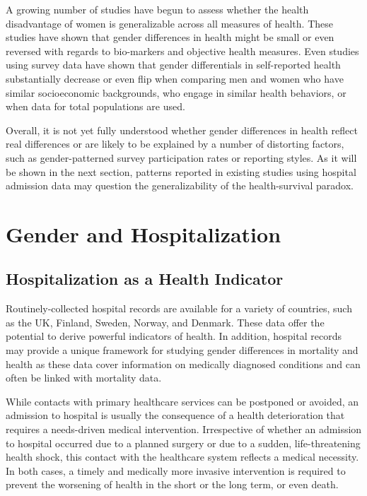 A growing number of studies have begun to assess whether the health 
disadvantage of women is generalizable across all measures of health. 
These studies have shown that gender differences in health might be 
small or even reversed with regards to bio-markers and objective 
health measures.\citep{oksuzyan2014sex,oksuzyan2015} Even studies 
using survey data have shown that gender differentials in self-reported 
health substantially decrease or even flip when comparing men and 
women who have similar socioeconomic backgrounds, who engage 
in similar health behaviors, or when data for total populations 
are used.\citep{lynch2007use,crimmins2010gender,dahlin2013cross,
karampampa2013trends,jensen2014temporal,westergaard2019population}

Overall, it is  not yet fully understood whether gender differences in 
health reflect real differences or are likely to be explained by a number 
of distorting factors, such as gender-patterned survey participation rates 
or reporting styles.\citep{oksuzyan2009male,oksuzyan2019story} As it will 
be shown in the next section, patterns reported in existing studies using 
hospital admission data may question the generalizability of the health-survival 
paradox. \\ 




\section{Gender and Hospitalization}

\subsection{Hospitalization as a Health Indicator}

Routinely-collected hospital records are available for a variety of 
countries, such as the UK, Finland, Sweden, Norway, and Denmark. 
These data offer the potential to derive powerful indicators of 
health. In addition, hospital records may provide a unique framework 
for studying gender differences in mortality and health as these 
data cover information on medically diagnosed conditions and can 
often be linked with mortality data.

While contacts with primary healthcare services can be 
postponed or avoided, an admission to hospital is usually the 
consequence of a health deterioration that requires a needs-driven medical 
intervention.\citep{case2005sex,lynch2007use,westergaard2019population} 
Irrespective of whether an admission to hospital occurred due to a 
planned surgery or due to a sudden, life-threatening health shock, 
this contact with the healthcare system reflects a medical necessity. 
In both cases, a timely and medically more invasive intervention is 
required to prevent the worsening of health in the short or the long 
term, or even death.

